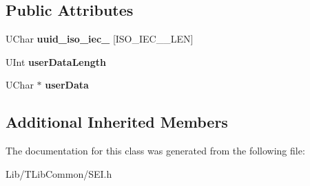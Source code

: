 \subsection*{Public Attributes}
\begin{DoxyCompactItemize}
\item 
\mbox{\label{class_s_e_iuser_data_unregistered_add9bb4ff848156d800e3df3a782e6263}} 
U\+Char {\bfseries uuid\+\_\+iso\+\_\+iec\+\_} \mbox{[}I\+S\+O\+\_\+\+I\+E\+C\+\_\+\_\+\+L\+EN\mbox{]}
\item 
\mbox{\label{class_s_e_iuser_data_unregistered_aca03ccb003e03179da024ecb8320a213}} 
U\+Int {\bfseries user\+Data\+Length}
\item 
\mbox{\label{class_s_e_iuser_data_unregistered_a0886d33c24cfe9b59ff0e1f30eb2e01f}} 
U\+Char $\ast$ {\bfseries user\+Data}
\end{DoxyCompactItemize}
\subsection*{Additional Inherited Members}


The documentation for this class was generated from the following file\+:\begin{DoxyCompactItemize}
\item 
Lib/\+T\+Lib\+Common/S\+E\+I.\+h\end{DoxyCompactItemize}
